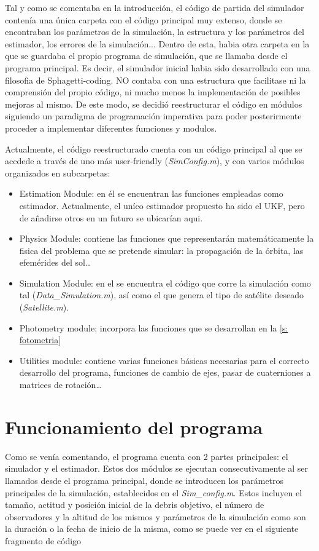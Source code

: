 Tal y como se comentaba en la introducción, el código de partida del simulador contenía una única carpeta con el código principal muy extenso,  donde se encontraban los parámetros de la simulación,  la estructura  y los parámetros del estimador, los errores de la simulación... Dentro de esta, habia otra carpeta en la que se guardaba el propio programa de simulación, que se llamaba desde el programa principal. Es decir, el simulador inicial habia sido desarrollado con una filosofia de Sphagetti-coding. NO contaba con una estructura que facilitase ni la comprensión del propio código, ni mucho menos la implementación de posibles mejoras al mismo. De este modo, se decidió reestructurar el código en módulos siguiendo un paradigma de  programación imperativa para poder posterirmente proceder a implementar diferentes fumciones y modulos.


Actualmente, el código reestructurado cuenta con un código principal al que se accdede a través de uno más user-friendly (\textit{SimConfig.m}), y con varios módulos organizados en subcarpetas:
\begin{itemize}
    \item Estimation Module: en él se encuentran las funciones empleadas como estimador. Actualmente, el uníco estimador propuesto ha sido el UKF, pero de añadirse otros en un futuro se ubicarían aqui.
    \item Physics Module: contiene las funciones que representarán matemáticamente la fisica del problema que se pretende simular: la propagación de la órbita, las efemérides del sol\dots
    \item Simulation Module: en el se encuentra el código que corre la simulación como tal (\textit{Data\_Simulation.m}), así como el que genera el tipo de satélite deseado (\textit{Satellite.m}).
    \item Photometry module: incorpora las funciones que se desarrollan en la \autoref{s: fotometria}
    \item Utilities module: contiene varias funciones básicas necesarias para el correcto desarrollo del programa, funciones de cambio de ejes, pasar de cuaterniones a matrices de rotación\dots
\end{itemize}


\section{Funcionamiento del programa}

Como se venía comentando, el programa cuenta con 2 partes principales: el simulador y el estimador. Estos dos módulos se ejecutan consecutivamente al ser llamados desde el programa principal, donde se introducen los parámetros principales de la simulación, establecidos en el \textit{Sim\_config.m}. Estos incluyen el tamaño, actitud y posición inicial de la debris objetivo, el número de observadores y la altitud de los mismos y parámetros de la simulación como son la duración o la fecha de inicio de la misma, como se puede ver en el siguiente fragmento de código 

